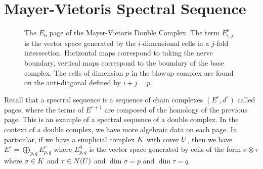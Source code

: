 \section{Mayer-Vietoris Spectral Sequence}
\begin{figure}[h]
\centering
{}
\caption{The $E_0$ page of the Mayer-Vietoris Double Complex. The term $E^0_{i,j}$ is the vector space generated by the $i$-dimensional cells in a $j$-fold intersection. Horizontal maps correspond to taking the nerve boundary, vertical maps correspond to the boundary of the base complex. The cells of dimension $p$ in the blowup complex are found on the anti-diagonal defined by $i+j = p$.}
\end{figure}
Recall that a spectral sequence is a sequence of chain complexes $(E^r, d^r)$ called pages, where the terms of $E^{r+1}$ are composed of the homology of the previous page. This is an example of a spectral sequence of a double complex. In the context of a double complex, we have more algebraic data on each page. In particular, if we have a simplicial complex $K$ with cover $U$, then we have $E^r = \bigoplus_{p,q} E^r_{p,q}$ where $E^0_{p,q}$ is the vector space generated by cells of the form $\sigma \otimes \tau$ where $\sigma \in K$ and $\tau \in N(U)$ and $\dim{\sigma} = p$ and $\dim{\tau} = q$. 
